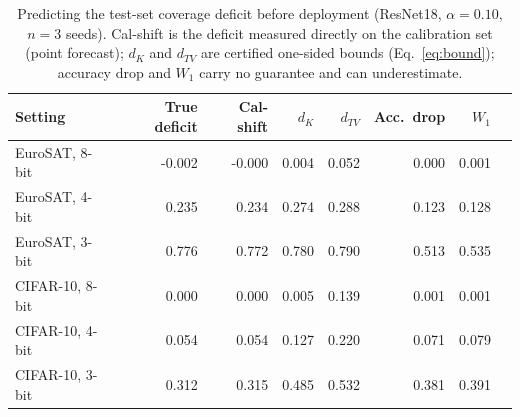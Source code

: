 \begin{table}[t]\centering\small
\caption{Predicting the test-set coverage deficit before deployment (ResNet18, $\alpha{=}0.10$, $n{=}3$ seeds). Cal-shift is the deficit measured directly on the calibration set (point forecast); $d_K$ and $d_{TV}$ are certified one-sided bounds (Eq.~\ref{eq:bound}); accuracy drop and $W_1$ carry no guarantee and can underestimate.}
\label{tab:base}
\begin{tabular}{lrrrrrrr}\toprule
Setting & True deficit & Cal-shift & $d_K$ & $d_{TV}$ & Acc.\ drop & $W_1$\\ \midrule
EuroSAT, 8-bit & -0.002 & -0.000 & 0.004 & 0.052 & 0.000 & 0.001\\
EuroSAT, 4-bit & 0.235 & 0.234 & 0.274 & 0.288 & 0.123 & 0.128\\
EuroSAT, 3-bit & 0.776 & 0.772 & 0.780 & 0.790 & 0.513 & 0.535\\
CIFAR-10, 8-bit & 0.000 & 0.000 & 0.005 & 0.139 & 0.001 & 0.001\\
CIFAR-10, 4-bit & 0.054 & 0.054 & 0.127 & 0.220 & 0.071 & 0.079\\
CIFAR-10, 3-bit & 0.312 & 0.315 & 0.485 & 0.532 & 0.381 & 0.391\\
\bottomrule\end{tabular}\end{table}